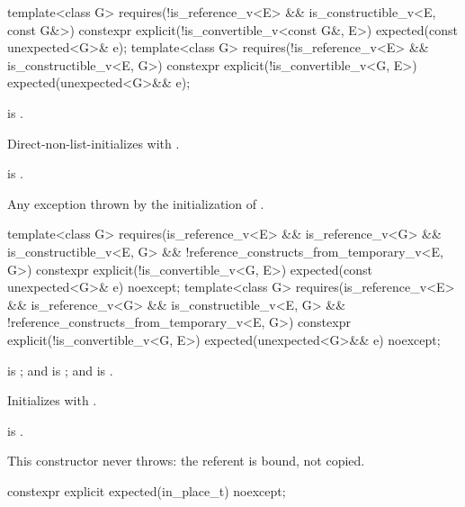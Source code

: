 %
\begin{itemdecl}
template<class G>
  requires(!is_reference_v<E> && is_constructible_v<E, const G&>)
constexpr explicit(!is_convertible_v<const G&, E>) expected(const unexpected<G>& e);
template<class G>
  requires(!is_reference_v<E> && is_constructible_v<E, G>)
constexpr explicit(!is_convertible_v<G, E>) expected(unexpected<G>&& e);
\end{itemdecl}

\begin{itemdescr}
\pnum
\constraints
{} is .

\pnum
\effects
Direct-non-list-initializes  with .

\pnum
\ensures
{} is .

\pnum
\throws
Any exception thrown by the initialization of .
\end{itemdescr}

%
\begin{itemdecl}
template<class G>
  requires(is_reference_v<E> && is_reference_v<G> && is_constructible_v<E, G> &&
           !reference_constructs_from_temporary_v<E, G>)
constexpr explicit(!is_convertible_v<G, E>) expected(const unexpected<G>& e) noexcept;
template<class G>
  requires(is_reference_v<E> && is_reference_v<G> && is_constructible_v<E, G> &&
           !reference_constructs_from_temporary_v<E, G>)
constexpr explicit(!is_convertible_v<G, E>) expected(unexpected<G>&& e) noexcept;
\end{itemdecl}

\begin{itemdescr}
\pnum
\constraints
{} is ; and  is ; and  is .

\pnum
\effects
Initializes  with .

\pnum
\ensures
{} is .

\pnum
\remarks
This constructor never throws: the referent is bound, not copied.
\end{itemdescr}

%
\begin{itemdecl}
constexpr explicit expected(in_place_t) noexcept;
\end{itemdecl}

